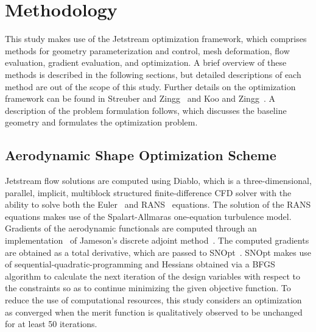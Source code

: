 \chapter{Methodology}
This study makes use of the Jetstream optimization framework, which comprises methods for geometry parameterization and control, mesh deformation, flow evaluation, gradient evaluation, and optimization. A brief overview of these methods is described in the following sections, but detailed descriptions of each method are out of the scope of this study. Further details on the optimization framework can be found in Streuber and Zingg~\cite{streuber_evaluating_2021} and Koo and Zingg~\cite{koo_investigation_2018}. A description of the problem formulation follows, which discusses the baseline geometry and formulates the optimization problem.
~\section{Aerodynamic Shape Optimization Scheme}
Jetstream flow solutions are computed using Diablo, which is a three-dimensional, parallel, implicit, multiblock structured finite-difference CFD solver with the ability to solve both the Euler~\cite{hicken_parallel_2008} and RANS~\cite{osusky_parallel_2013} equations. The solution of the RANS equations makes use of the Spalart-Allmaras one-equation turbulence model. Gradients of the aerodynamic functionals are computed through an implementation~\cite{hicken_efficient_2009,osusky_drag_2015} of Jameson's discrete adjoint method~\cite{jameson_aerodynamic_1988}. The computed gradients are obtained as a total derivative, which are passed to SNOpt~\cite{gill_snopt_2005}. SNOpt makes use of sequential-quadratic-programming and Hessians obtained via a BFGS algorithm to calculate the next iteration of the design variables with respect to the constraints so as to continue minimizing the given objective function. To reduce the use of computational resources, this study considers an optimization as converged when the merit function is qualitatively observed to be unchanged for at least 50 iterations.

